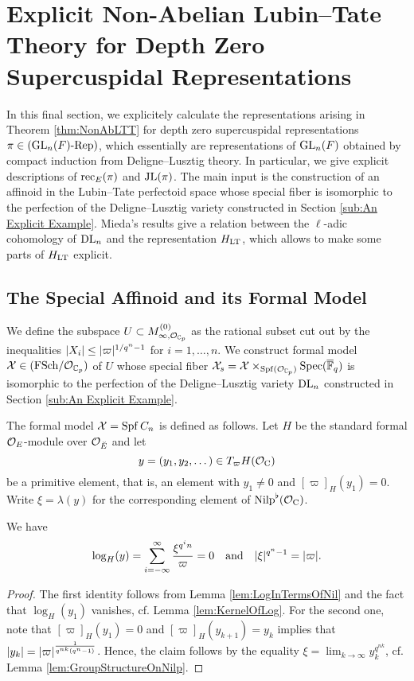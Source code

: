 \documentclass[../main.tex]{subfiles}
\begin{document}
\section{Explicit Non-Abelian Lubin--Tate Theory for Depth Zero Supercuspidal
Representations} %
\label{sec:Explicit Non-Abelian Lubin-Tate Theory for Depth Zero Supercuspidal Representations}

In this final section, we explicitely calculate the representations
arising in Theorem \ref{thm:NonAbLTT} for depth zero supercuspidal
representations $\pi \in {({\operatorname{GL}_n(F)}\text-\allowbreak\mathrm{Rep})}$, which essentially are representations
of $\operatorname{GL}_n(F)$
obtained by compact induction from Deligne--Lusztig theory. In
particular, we give explicit descriptions of $\mathrm{rec}_E(\pi)$ and $\mathrm{JL}(\pi)$. 
The main input is the construction of an affinoid in the Lubin--Tate perfectoid
space whose special fiber is isomorphic to the perfection of the 
Deligne--Lusztig variety constructed in Section \ref{sub:An Explicit Example}.
Mieda's results give a relation between the $\ell$-adic cohomology of $\mathrm{DL}_n$
and the representation $H_{\mathrm{LT}}$, which allows to make some parts of $H_{\mathrm{LT}}$
explicit.

\subsection{The Special Affinoid and its Formal Model} %
\label{sub:The Special Affinoid}
We define the subspace $U \subset M_{\infty,\mathcal{O}_{\mathbb{C}_p}}^{(0)}$ as the rational
subset cut out by the inequalities $\lvert X_i \rvert \leq \lvert \varpi \rvert^{1/q^n-1}$ for
$i = 1, \dots, n$. We construct formal model $\mathcal{X} \in {(\mathrm{FSch}/{\mathcal{O}_{\mathbb{C}_p}})}$
of $U$ whose special fiber $\mathcal{X}_s = 
\mathcal{X} \times_{\operatorname{Spf}(\mathcal{O}_{\mathbb{C}_p})}\operatorname{Spec}(\overline {\mathbb{F}}_q)$ is isomorphic to the perfection of the
Deligne--Lusztig variety $\mathrm{DL}_n$ constructed in Section \ref{sub:An Explicit Example}.

The formal model $\mathcal{X} = \operatorname{Spf} C_n$ is defined as follows. Let $H$ be the
standard formal $\mathcal{O}_E$-module over $\mathcal{O}_{\breve {E}}$ and let 
$$y = (y_1, y_2, \dots) \in T_\varpi H(\mathcal{O}_{\mathrm{C}})$$ be a primitive element, that is,
an element with $y_1 \neq 0$ and $[\varpi]_H(y_1) = 0$. Write $\xi = \lambda(y)$ 
for the corresponding element of ${\mathrm{Nilp}}^\flat(\mathcal{O}_{\mathrm{C}})$. 

\begin{lem}\label{lem:PropertiesOfXi}
  We have 
  \begin{equation*}
    \log_H(y) = \sum_{i = -\infty}^ \infty \frac{\xi^{q^in}}{\varpi} = 0
    \quad \text{and} \quad
    \lvert \xi \rvert^{q^n-1} = \lvert \varpi \rvert.
  \end{equation*}
\begin{proof}
  The first identity follows from Lemma \ref{lem:LogInTermsOfNil} and the fact that
  $\log_H(y_1)$ vanishes, cf. Lemma \ref{lem:KernelOfLog}. 
  For the second one, note that $[\varpi]_H(y_1) = 0$ and 
  $[\varpi]_H(y_{k+1}) = y_k$ implies that 
  $\lvert y_k \rvert = \lvert \varpi \rvert^{\frac{1}{q^{nk}(q^n-1)}}$. Hence, the claim follows by
  the equality $\xi = \lim_{k \to \infty} y_k^{q^{nk}}$, cf. Lemma
  \ref{lem:GroupStructureOnNilp}.
\end{proof}
\end{lem}
\end{document}
